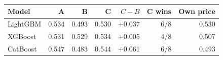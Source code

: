 \begin{center}\small
\begin{tabular}{@{}lrrrrrr@{}}\toprule
Model & A & B & C & $C-B$ & C wins & Own price\\\midrule
LightGBM & 0.534 & 0.493 & 0.530 & +0.037 & 6/8 & 0.530\\
XGBoost & 0.531 & 0.529 & 0.534 & +0.005 & 4/8 & 0.507\\
CatBoost & 0.547 & 0.483 & 0.544 & +0.061 & 6/8 & 0.493\\
\bottomrule\end{tabular}\end{center}
